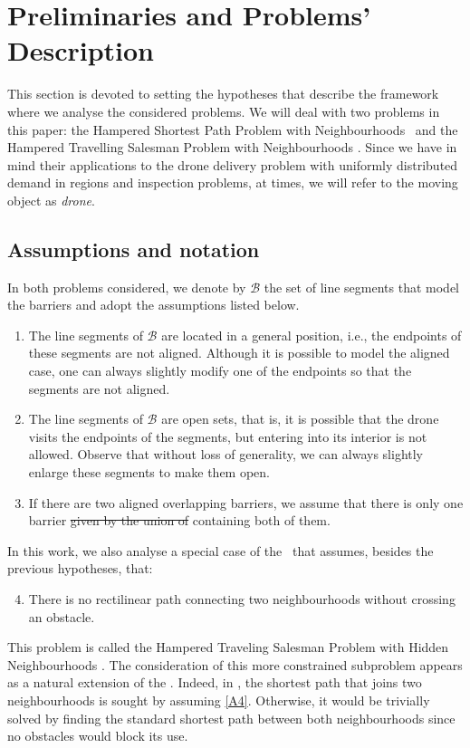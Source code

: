 \documentclass[a4paper,  review, authoryear, 1p.]{elsarticle}
\newcommand{\SPPN}{{\sf{H-SPPN}\xspace }}
\newcommand{\TSPHN}{{\sf{H-TSPHN}\xspace }}
\newcommand{\TSPN}{{\sf{H-TSPN}\xspace }}
\newcommand{\CV}[1]{{\color{red}#1}}
\begin{document}
	
	\section{Preliminaries and Problems'  Description \label{section:description}}

	This section is devoted to setting the hypotheses that describe the framework where we analyse the considered problems.
	We will deal with two problems in this paper: the Hampered Shortest Path Problem with Neighbourhoods \SPPN \ and the Hampered Travelling Salesman Problem with Neighbourhoods \TSPN. Since we have in mind their applications to the drone delivery problem with uniformly distributed demand in regions and inspection problems, at times, we will refer to the moving object as \textit{drone}. 
	
	\CV{\subsection{Assumptions and notation}}
	In both problems considered, we denote by $\mathcal{B}$ the set of line segments that model the barriers and adopt the assumptions listed below.
	
	\begin{enumerate}[label=\textbf{A\arabic*},ref=\textbf{A\arabic*}]
		\item \label{A1}The line segments of $\mathcal B$ are located in a general position, i.e., the endpoints of these segments are not aligned. Although it is possible to model the aligned case, one can always slightly modify one of the endpoints so that the segments are not aligned.
		\item The line segments of $\mathcal B$ are open sets, that is, it is possible that the drone visits the endpoints of the segments, but entering into its interior is not allowed. Observe that without loss of generality, we can always slightly enlarge these segments to make them open.
		\item \label{A3}If there are two \CV{aligned} overlapping barriers, we assume that there is only one barrier \sout{given by the union of} \CV{containing both of} them.
	\end{enumerate}
	
	In this work, we also analyse a special case of the \TSPN \ that assumes, besides the previous hypotheses, that:
	\begin{enumerate}[label=\textbf{A\arabic*}, ref=\textbf{A\arabic*}]
		\setcounter{enumi}{3}
		\item \label{A4}There is no rectilinear path connecting two neighbourhoods without crossing an obstacle.
	\end{enumerate} 
	This problem is called the Hampered Traveling Salesman Problem with Hidden Neighbourhoods \TSPHN. The consideration of this more constrained subproblem appears as a natural extension of the \SPPN. Indeed, in \SPPN, the shortest path that joins two neighbourhoods is sought by assuming \ref{A4}. Otherwise, it would be trivially solved by finding the standard shortest path between both neighbourhoods since no obstacles would block its use.
	
\end{document}
